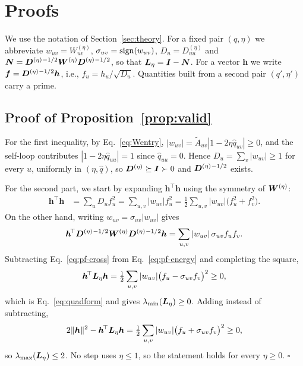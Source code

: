 \section{Proofs}\label{app:proofs}
\allowdisplaybreaks
We use the notation of Section~\ref{sec:theory}.
For a fixed pair $(q,\eta)$ we abbreviate $w_{uv}=W^{(\eta)}_{uv}$, $\sigma_{uv}=\operatorname{sign}(w_{uv})$, $D_u=D^{(\eta)}_{uu}$ and $\bm N=\bm{D}^{(\eta)}{}^{-1/2}\bm{W}^{(\eta)}\bm{D}^{(\eta)}{}^{-1/2}$, so that $\bm{L}_{\eta}=\bm I-\bm N$.
For a vector $\bm h$ we write $\bm f=\bm{D}^{(\eta)}{}^{-1/2}\bm h$, i.e., $f_u=h_u/\sqrt{D_u}$.
Quantities built from a second pair $(q',\eta')$ carry a prime.

\subsection{Proof of Proposition~\ref{prop:valid}}
For the first inequality, by Eq.~\eqref{eq:Wentry},
$|w_{uv}|=\tilde A_{uv}|1-2\eta\hat q_{uv}|\ge0$, and the self-loop
contributes $|1-2\eta\hat q_{uu}|=1$ since $\hat q_{uu}=0$. Hence
$D_u=\sum_v|w_{uv}|\ge1$ for every $u$, uniformly in
$(\eta,\hat q)$, so $\bm{D}^{(\eta)}\succeq\bm I\succ0$ and $\bm{D}^{(\eta)}{}^{-1/2}$ exists.

For the second part, we start by expanding $\bm h^{\!\top}\bm h$ using the symmetry of $\bm{W}^{(\eta)}$:
\begin{align}
\bm h^{\!\top}\bm h
&=\sum_uD_uf_u^2=\sum_{u,v}|w_{uv}|f_u^2
=\tfrac12\sum_{u,v}|w_{uv}|\bigl(f_u^2+f_v^2\bigr).
\label{eq:pf-energy}
\end{align}
On the other hand, writing $w_{uv}=\sigma_{uv}|w_{uv}|$ gives
\begin{equation}
\bm h^{\!\top}\bm{D}^{(\eta)}{}^{-1/2}\bm{W}^{(\eta)}\bm{D}^{(\eta)}{}^{-1/2}\bm h
=\sum_{u,v}|w_{uv}|\,\sigma_{uv}f_uf_v.
\label{eq:pf-cross}
\end{equation}
Subtracting Eq.~\eqref{eq:pf-cross} from Eq.~\eqref{eq:pf-energy} and completing the square,
\begin{equation}
\bm h^{\!\top}\bm{L}_{\eta}\bm h
=\tfrac12\sum_{u,v}|w_{uv}|\bigl(f_u-\sigma_{uv}f_v\bigr)^2\ge0,
\label{eq:pf-lower}
\end{equation}
which is Eq.~\eqref{eq:quadform} and gives $\lambda_{\min}(\bm{L}_{\eta})\ge0$.
Adding instead of subtracting,
\begin{equation}
2\Vert\bm h\Vert^2-\bm h^{\!\top}\bm{L}_{\eta}\bm h
=\tfrac12\sum_{u,v}|w_{uv}|\bigl(f_u+\sigma_{uv}f_v\bigr)^2\ge0,
\label{eq:pf-upper}
\end{equation}
so $\lambda_{\max}(\bm{L}_{\eta})\le2$.
No step uses $\eta\le1$, so the statement holds for every $\eta\ge0$.
\hfill$\square$

